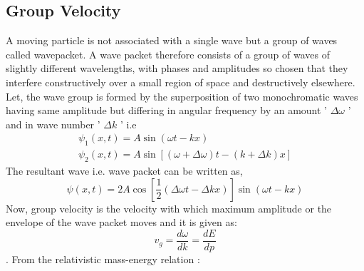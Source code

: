 \subsection{Group Velocity}
A moving particle is not associated with a single wave but a group of waves called wavepacket.
A wave packet therefore consists of a
group of waves of slightly different wavelengths, with phases and amplitudes so chosen that
they interfere constructively over a small region of space and destructively elsewhere.
Let, the wave group is formed by the superposition of two monochromatic waves having same amplitude but differing in angular frequency by an amount ' $\Delta \omega$ ' and in wave number ' $\Delta k$ ' i.e
$$
\begin{array}{l}
\psi_{1}(x,t)=A \sin (\omega t-k x) \\
\psi_{2}(x,t)=A \sin [(\omega+\Delta \omega) t-(k+\Delta k) x]
\end{array}
$$
The resultant wave i.e. wave packet can be written as,
$$
\psi(x,t)=2 A \cos \left[\frac{1}{2}(\Delta \omega t-\Delta k x)\right] \sin (\omega t-k x)
$$
Now, group velocity is the velocity with which maximum amplitude or the envelope of the wave packet moves and it is given as: $$v_{g}=\frac{d \omega}{d k}=\frac{d E}{d p}$$.
From the relativistic mass-energy relation :


